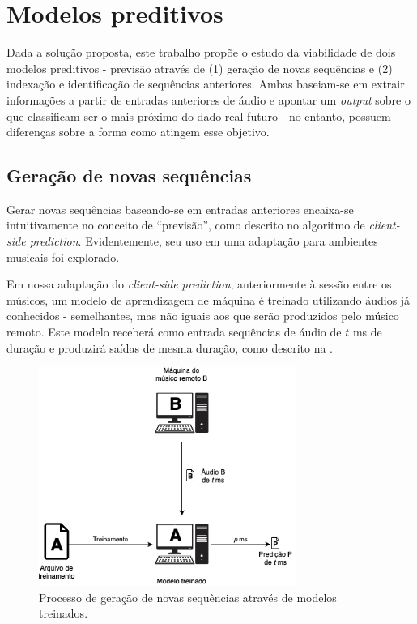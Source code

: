 \section{Modelos preditivos}

Dada a solução proposta, este trabalho propõe o estudo da viabilidade de dois modelos preditivos - previsão através de (1) geração de novas sequências e (2) indexação e identificação de sequências anteriores. Ambas baseiam-se em extrair informações a partir de entradas anteriores de áudio e apontar um \textit{output} sobre o que classificam ser o mais próximo do dado real futuro - no entanto, possuem diferenças sobre a forma como atingem esse objetivo.

\subsection{Geração de novas sequências}
\label{subsec:new_sequence_generator}

Gerar novas sequências baseando-se em entradas anteriores encaixa-se intuitivamente no conceito de ``previsão'', como descrito no algoritmo de \textit{client-side prediction}. Evidentemente, seu uso em uma adaptação para ambientes musicais foi explorado.

Em nossa adaptação do \textit{client-side prediction}, anteriormente à sessão entre os músicos, um modelo de aprendizagem de máquina é treinado utilizando áudios já conhecidos -  semelhantes, mas não iguais aos que serão produzidos pelo músico remoto. Este modelo receberá como entrada sequências de áudio de $t$ ms de duração e produzirá saídas de mesma duração, como descrito na .

\begin{figure}[htbp]
    \centering
    \includegraphics[width=0.75\textwidth]{images/prediction-model.png}
    \caption{Processo de geração de novas sequências através de modelos treinados.}
    \label{fig:generative_model}
\end{figure}

